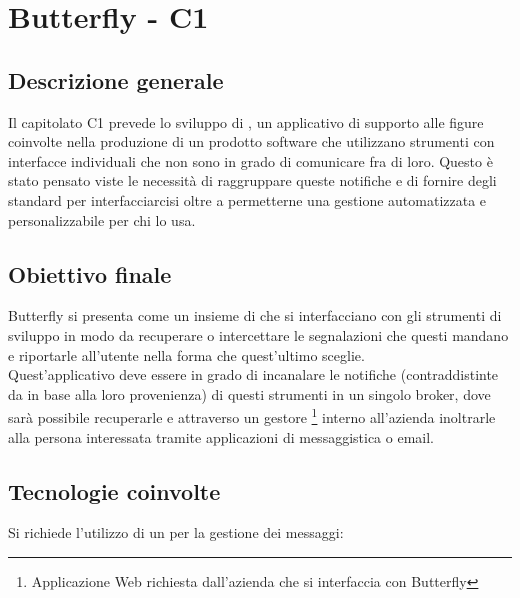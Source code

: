 \section{Butterfly - C1} \label{c1}
    \subsection{Descrizione generale}
    Il capitolato C1 prevede lo sviluppo di \progetto, un applicativo di supporto alle figure coinvolte nella produzione di un prodotto software che utilizzano strumenti con interfacce individuali che non sono in grado di comunicare fra di loro.
    Questo  è stato pensato viste le necessità di raggruppare queste notifiche e di fornire degli standard per interfacciarcisi oltre a permetterne una gestione automatizzata e personalizzabile per chi lo usa.

    \subsection{Obiettivo finale}
    Butterfly si presenta come un insieme di  che si interfacciano con gli strumenti di sviluppo in modo da recuperare o intercettare le segnalazioni che questi mandano e riportarle all'utente nella forma che quest'ultimo sceglie.\\
    Quest'applicativo deve essere in grado di incanalare le notifiche (contraddistinte da  in base alla loro
    provenienza) di questi strumenti in un singolo broker, dove sarà possibile recuperarle e attraverso un gestore%
    \footnote{Applicazione Web richiesta dall'azienda che si interfaccia con Butterfly} interno all'azienda
    inoltrarle alla persona interessata tramite applicazioni di messaggistica o email.

    \subsection{Tecnologie coinvolte}
    Si richiede l'utilizzo di un  per la gestione dei messaggi:

